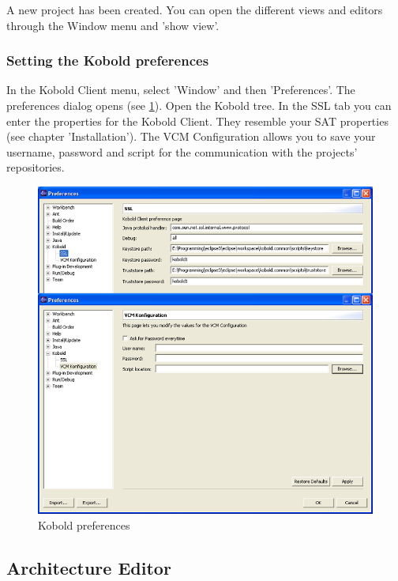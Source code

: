 A new project has been created. You can open the different views and editors through the Window menu
and 'show view'. 

\subsubsection{Setting the Kobold preferences}
In the Kobold Client menu, select 'Window' and then 'Preferences'. The preferences
dialog opens (see \ref{pref}). Open the Kobold tree. In the SSL tab you can enter the 
properties for the Kobold Client. They resemble your SAT properties (see chapter 'Installation').
The VCM Configuration allows you to save your username, password and script for the
communication with the projects' repositories.

\begin{figure}[h!]
\begin{center}
\includegraphics[width=14cm]{pref.png}
   \caption{Kobold preferences}
\label{pref}
\end{center}
\end{figure}\par



\subsection{Architecture Editor}

